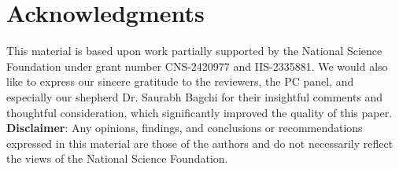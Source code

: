 \section*{Acknowledgments}
This material is based upon work partially supported by the National Science Foundation under grant number CNS-2420977 and IIS-2335881.
We would also like to express our sincere gratitude to the reviewers, the PC panel, and especially our shepherd Dr. 
Saurabh Bagchi for their insightful comments and thoughtful consideration, which significantly improved the quality of this paper. \\
\textbf{Disclaimer}: Any opinions, findings, and
conclusions or recommendations expressed in this material are those of the authors and do not necessarily
reflect the views of the National Science Foundation.
